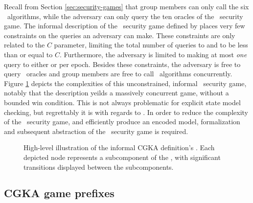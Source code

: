 Recall from Section \ref{sec:security-games} that group members can only call the six \CGKAdef\ algorithms, while the adversary can only query the ten oracles of the \CGKAsec\ security game.
The informal description of the \CGKAsec\ security game defined by \autocite{alwen2020security} places very few constraints on the queries an adversary can make.
These constraints are only related to the \(C\) parameter, limiting the total number of queries to  and  to be less than or equal to \(C\).
Furthermore, the adversary is limited to making at most \emph{one} query to either  or  per epoch.
Besides these constraints, the adversary is free to query \CGKAsec\ oracles and group members are free to call \CGKAdef\ algorithms concurrently.
Figure \ref{fig:CGKA-informal} depicts the complexities of this unconstrained, informal \CGKAsec\ security game, notably that the description yeilds a massively concurrent game, without a bounded win condition.
This is not always problematic for explicit state model checking, but regrettably it is with regards to \CGKAsec.
In order to reduce the complexity of the \CGKAsec\ security game, and efficiently produce an encoded model, formalization and subsequent abstraction of the \CGKAsec\ security game is required.

\begin{figure}[ht!]
\centering
\caption[Transition graph of informal CGKA definition]{%
\label{fig:CGKA-informal}%
High-level illustration of the informal CGKA definition's .%
Each depicted node represents a subcomponent of the , with significant transitions displayed between the subcomponents.
}%
\end{figure}

\hypertarget{sec:game-prefixes}{%
\subsection{CGKA game prefixes}\label{sec:game-prefixes}}

